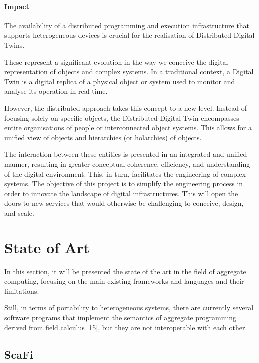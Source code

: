 \paragraph{Impact}
The availability of a distributed programming and execution infrastructure that supports heterogeneous devices is crucial
for the realisation of Distributed Digital Twins.

These represent a significant evolution in the way we conceive the digital representation of objects and complex systems.
In a traditional context, a Digital Twin is a digital replica of a physical object or system used to monitor and analyse
its operation in real-time.

However, the distributed approach takes this concept to a new level.
Instead of focusing solely on specific objects, the Distributed Digital Twin encompasses entire organisations of people
or interconnected object systems.
This allows for a unified view of objects and hierarchies (or holarchies) of objects.

The interaction between these entities is presented in an integrated and unified manner, resulting in greater conceptual
coherence, efficiency, and understanding of the digital environment.
This, in turn, facilitates the engineering of complex systems.
The objective of this project is to simplify the engineering process in order to innovate the landscape of digital infrastructures.
This will open the doors to new services that would otherwise be challenging to conceive, design, and scale.

\section{State of Art}
\label{sec:state-of-art}

In this section, it will be presented the state of the art in the field of aggregate computing, focusing on the main existing
frameworks and languages and their limitations.

Still, in terms of portability to heterogeneous systems, there are currently several software programs that implement the
semantics of aggregate programming derived from field calculus [15], but they are not interoperable with each other.

\subsection{ScaFi}
\label{subsec:scafi}


